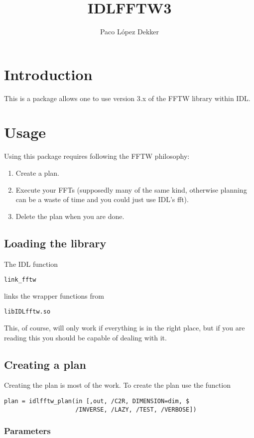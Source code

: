 \documentclass[a4paper,11pt]{article}
\title{IDLFFTW3}
\author{Paco López Dekker}
\begin{document}
\maketitle

\section{Introduction}

This is a package allows one to use version 3.x of the FFTW library within IDL.

\section{Usage}

Using this package requires following the FFTW philosophy:
\begin{enumerate}
\item Create a plan.
\item Execute your FFTs (supposedly many of the same kind, otherwise planning can be a waste of time and you could just use IDL's fft).
\item Delete the plan when you are done.
\end{enumerate}

\subsection{Loading the library}

The IDL function
\begin{verbatim}
link_fftw
\end{verbatim}
links the wrapper functions from 
\begin{verbatim}
libIDLfftw.so
\end{verbatim}
This, of course, will only work if everything is in the right place, but if you are reading this you should be capable of dealing with it.

\subsection{Creating a plan}

Creating the plan is most of the work. To create the plan use the function
\begin{verbatim}
plan = idlfftw_plan(in [,out, /C2R, DIMENSION=dim, $
                    /INVERSE, /LAZY, /TEST, /VERBOSE])
\end{verbatim}

\subsubsection*{Parameters}
\end{document}
